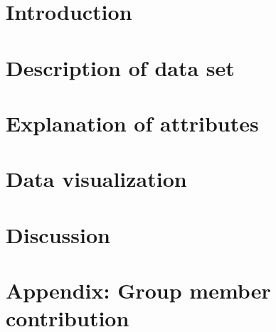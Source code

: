 








\setcounter{tocdepth}{1}
\tableofcontents


\section{Introduction}


\section{Description of data set}\label{sec:description_of_data_set}



\section{Explanation of attributes}\label{sec:explanation_of_variables}


\section{Data visualization}\label{sec:data_visualization}


\section{Discussion}\label{sec:discussion}





\section*{Appendix: Group member contribution}
{}



